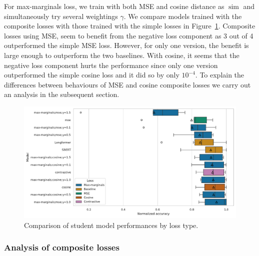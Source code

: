 For max-marginals loss, we train with both MSE and cosine distance as
$\operatorname{sim}$ and simultaneously try several weightings $\gamma$. We
compare models trained with the composite losses with those trained with the
simple losses in Figure~\ref{fig:structural_composite_vs_simple}. Composite
losses using MSE, seem to benefit from the negative loss component as 3 out of
4 outperformed the simple MSE loss. However, for only one version, the benefit
  is large enough to outperform the two baselines. With cosine, it seems that
  the negative loss component hurts the performance since only one version
  outperformed the simple cosine loss and it did so by only $10^{-4}$. To
  explain the differences between behaviours of MSE and cosine composite losses
  we carry out an analysis in the subsequent section.

\begin{figure}

  \includegraphics[width=\textwidth]{./img/structural_both_losses.pdf}

  \caption{Comparison of student model performances by loss type.}
  \label{fig:structural_composite_vs_simple}
\end{figure}

\subsubsection{Analysis of composite losses}\label{section:composite_analysis}

